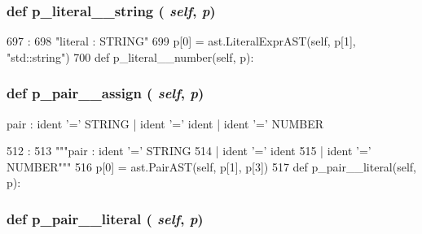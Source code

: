 \begin{DoxyVerb}
{\subsubsection[{p\_\-literal\_\-\_\-string}]{\setlength{\rightskip}{0pt plus 5cm}def p\_\-literal\_\-\_\-string ( {\em self}, \/   {\em p})}}
\label{classslicc_1_1parser_1_1SLICC_afb56a210832d7241c7b30a71208f3e78}



\begin{DoxyCode}
697                                   :
698         "literal : STRING"
699         p[0] = ast.LiteralExprAST(self, p[1], "std::string")
700 
    def p_literal__number(self, p):
\end{DoxyCode}
\hypertarget{classslicc_1_1parser_1_1SLICC_a5e41d69732541552bf82fcaaa668ac0b}{
\subsubsection[{p\_\-pair\_\-\_\-assign}]{\setlength{\rightskip}{0pt plus 5cm}def p\_\-pair\_\-\_\-assign ( {\em self}, \/   {\em p})}}
\label{classslicc_1_1parser_1_1SLICC_a5e41d69732541552bf82fcaaa668ac0b}
\begin{DoxyVerb}pair : ident '=' STRING
| ident '=' ident
| ident '=' NUMBER\end{DoxyVerb}
 


\begin{DoxyCode}
512                                :
513         """pair : ident '=' STRING
514                 | ident '=' ident
515                 | ident '=' NUMBER"""
516         p[0] = ast.PairAST(self, p[1], p[3])
517 
    def p_pair__literal(self, p):
\end{DoxyCode}
\hypertarget{classslicc_1_1parser_1_1SLICC_a885647ed0a56c566300f99748db04d44}{
\subsubsection[{p\_\-pair\_\-\_\-literal}]{\setlength{\rightskip}{0pt plus 5cm}def p\_\-pair\_\-\_\-literal ( {\em self}, \/   {\em p})}}
\label{classslicc_1_1parser_1_1SLICC_a885647ed0a56c566300f99748db04d44}




\end{DoxyVerb}

